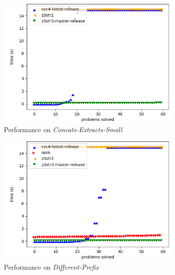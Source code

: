 \begin{figure}[h]
    \begin{subfigure}{.5\textwidth}
        \includegraphics[width=\textwidth]{data/graphs/concats-extracts-small.png}
        \caption{Performance on \textit{Concats-Extracts-Small}}
        \label{fig:concats-extracts-small}
    \end{subfigure}
    \begin{subfigure}{.5\textwidth}
        \includegraphics[width=\textwidth]{data/graphs/different-prefix.png}
        \caption{Performance on \textit{Different-Prefix}}
        \label{fig:different-prefix}
    \end{subfigure}
    \caption{Instances hard for \cvc{}}
    \label{fig:cvc-hard}
    \bigskip
    \begin{subfigure}{.5\textwidth}

\end{subfigure}
\end{figure}
